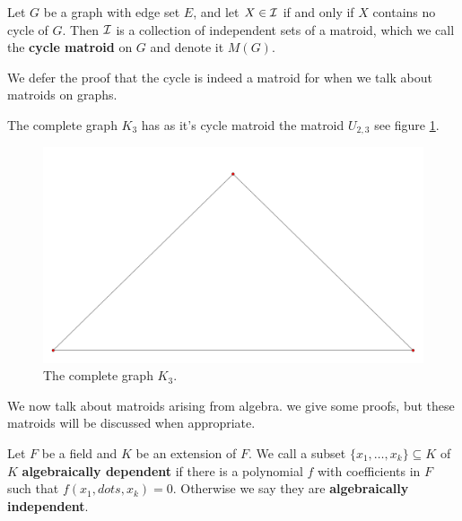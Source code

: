 \begin{definition}
    Let $G$ be a graph with edge set  $E$, and let  $X \in \mathcal{I}$ if and only if  $X$ contains no
    cycle of  $G$. Then  $\mathcal{I}$ is a collection of independent sets of a matroid, which we call the
    \textbf {cycle matroid} on $G$ and denote it  $M(G)$.		
\end{definition}

We defer the proof that the cycle is indeed a matroid for when we talk about matroids on graphs.

\begin{example}
    The complete graph $K_3$ has as it's cycle matroid the matroid  $U_{2,3}$ see figure
    \ref{fig:1.1}.
    \begin{figure}
        \centering
        \includegraphics[scale = 0.3]{Figures/Chapter1/k3cyclemat.png}
        \caption{The complete graph $K_3$.}
        \label{fig:1.1}
    \end{figure}
\end{example} 

We now talk about matroids arising from algebra. we give some proofs, but these matroids will be
discussed when appropriate.

\begin{definition}
    Let $F$ be a field and  $K$ be an extension of $F$. We call a subset  $\{x_1, \dots, x_k\}
    \subseteq K$ of $K$ \textbf {algebraically dependent} if there is a polynomial $f$ with
    coefficients in  $F$ such that  $f(x_1, dots, x_k)=0$. Otherwise we say they are \textbf
    {algebraically independent}.
\end{definition}

